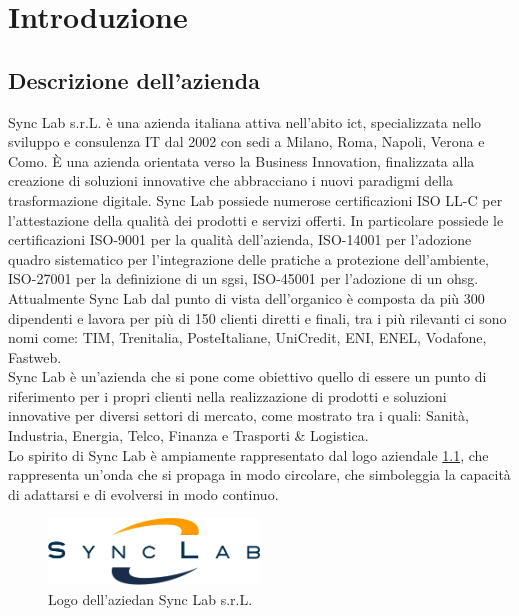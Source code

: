 \chapter{Introduzione}
\label{cap:introduzione}
\section{Descrizione dell'azienda}
Sync Lab s.r.L. è una azienda italiana attiva nell'abito \gls{ict}{}, specializzata nello sviluppo e consulenza IT dal 2002 con sedi a 
Milano, Roma, Napoli, Verona e Como. È una azienda orientata verso la Business Innovation, finalizzata alla 
creazione di soluzioni innovative che abbracciano i nuovi paradigmi della trasformazione digitale.
Sync Lab possiede numerose certificazioni ISO LL-C per l'attestazione della 
qualità dei prodotti e servizi offerti. In particolare possiede le certificazioni 
ISO-9001 per la qualità dell'azienda, ISO-14001 per l'adozione quadro sistematico per l'integrazione delle pratiche a protezione dell'ambiente, ISO-27001 per la definizione di un \gls{sgsi}{}, ISO-45001 per l'adozione di un \gls{ohsg}{}.
\\
Attualmente Sync Lab dal punto di vista dell'organico è composta da più 300 dipendenti e lavora per più di 150 clienti diretti e finali, tra i più rilevanti ci sono nomi come: TIM, Trenitalia, PosteItaliane, UniCredit, ENI, ENEL, Vodafone, Fastweb.
\\
Sync Lab è un'azienda che si pone come obiettivo quello di essere un punto di riferimento per i propri clienti nella realizzazione di prodotti e soluzioni innovative per diversi settori di mercato, come mostrato  tra i quali: Sanità, Industria, Energia, Telco, Finanza e Trasporti \& Logistica.\\
Lo spirito di Sync Lab è ampiamente rappresentato dal logo aziendale \ref{figure:logo_azienda}, che rappresenta un'onda che si propaga in modo circolare, che simboleggia la capacità di adattarsi e di evolversi in modo continuo.\\


\begin{figure}[htbp]  
\centering
    \includegraphics[width=0.5\textwidth]{images/introduzione/logo_azienda.png}
    \caption{Logo dell'aziedan Sync Lab s.r.L.}
    \label{figure:logo_azienda}
\end{figure}
\pagebreak
